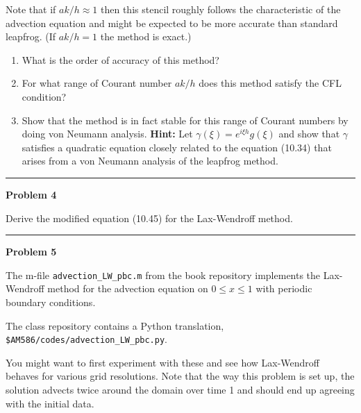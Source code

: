 \documentclass[10pt]{article}
\begin{document}
Note that if $ak/h \approx 1$ then this stencil roughly follows the
characteristic of the advection equation and might be expected to be more
accurate than standard leapfrog.  (If $ak/h = 1$ the method is exact.)


\begin{enumerate}

\item What is the order of accuracy of this method?

\item For what range of Courant number $ak/h$ does this method satisfy the
CFL condition?

\item Show that the method is in fact stable for this range of Courant
numbers by doing von Neumann analysis.  
{\bf Hint:} Let $\gamma(\xi) = e^{i\xi h}g(\xi)$ and show that $\gamma$
satisfies a quadratic equation closely related to the equation (10.34)
that arises from a von Neumann analysis of the leapfrog method.

\end{enumerate}


\vskip 1cm
\hrule
{\bf Problem 4}  


Derive the modified equation (10.45) for the Lax-Wendroff method.



\vskip 1cm
\hrule
{\bf Problem 5}  


The m-file \verb+advection_LW_pbc.m+ from the book repository
implements the Lax-Wendroff method for
the advection equation on $0\leq x\leq 1$ with 
periodic boundary conditions.

The class repository contains a Python translation, \verb+$AM586/codes/advection_LW_pbc.py+.

You might want to first experiment with these and see how Lax-Wendroff behaves for various grid resolutions.  Note that the way this problem is set up, the solution advects twice around the domain over time 1 and should end up agreeing with the initial data. 
\end{document}
